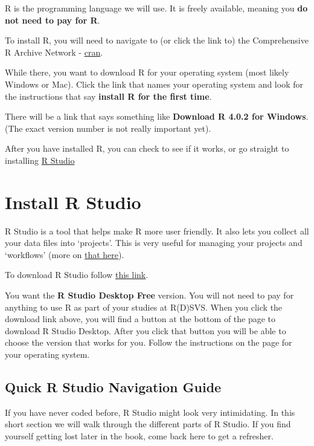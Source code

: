 \documentclass[
]{book}
\begin{document}
R is the programming language we will use. It is freely available, meaning you \textbf{do not need to pay for R}.

To install R, you will need to navigate to (or click the link to) the Comprehensive R Archive Network - \href{https://cran.r-project.org/}{cran}.

While there, you want to download R for your operating system (most likely Windows or Mac). Click the link that names your operating system and look for the instructions that say \textbf{install R for the first time}.

There will be a link that says something like \textbf{Download R 4.0.2 for Windows}. (The exact version number is not really important yet).

After you have installed R, you can check to see if it works, or go straight to installing \protect\hyperlink{install_rs}{R Studio}

\hypertarget{install_rs}{%
\section{Install R Studio}\label{install_rs}}

R Studio is a tool that helps make R more user friendly. It also lets you collect all your data files into `projects'. This is very useful for managing your projects and `workflows' (more on \protect\hyperlink{workflows}{that here}).

To download R Studio follow \href{https://rstudio.com/products/rstudio/download/?utm_source=downloadrstudio\&utm_medium=Site\&utm_campaign=home-hero-cta}{this link}.

You want the \textbf{R Studio Desktop Free} version. You will not need to pay for anything to use R as part of your studies at R(D)SVS. When you click the download link above, you will find a button at the bottom of the page to download R Studio Desktop. After you click that button you will be able to choose the version that works for you. Follow the instructions on the page for your operating system.

\hypertarget{navigate_rs}{%
\subsection{Quick R Studio Navigation Guide}\label{navigate_rs}}

If you have never coded before, R Studio might look very intimidating. In this short section we will walk through the different parts of R Studio. If you find yourself getting lost later in the book, come back here to get a refresher.
\end{document}
